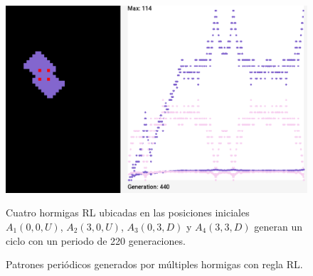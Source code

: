 \documentclass[12pt,twoside]{article}
\begin{document}
\begin{figure}[h!]
	\begin{minipage}{0.45\textwidth}
		\centering
		\includegraphics[width=1.4\textwidth]{img/4_rl_1.png}
	\end{minipage}
	\vspace{0.3cm}
	
	\begin{minipage}{0.9\textwidth}
		\centering
		\small Cuatro hormigas RL ubicadas en las posiciones iniciales $A_1(0, 0, U)$, $A_2(3, 0, U)$, $A_3(0, 3, D)$ y $A_4(3, 3, D)$ generan un ciclo con un periodo de 220 generaciones.  
	\end{minipage}
	
	\caption{Patrones periódicos generados por múltiples hormigas con regla RL.}
	\label{fig:pat}
\end{figure}

\clearpage
\end{document}
